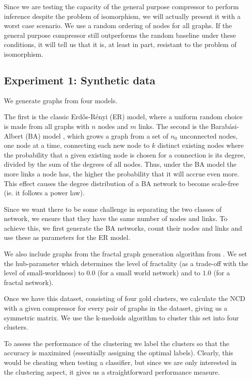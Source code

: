 \documentclass{article}
\begin{document}
Since we are testing the capacity of the general purpose compressor to perform inference despite the problem of isomorphism, we will actually present it with a worst case scenario. We use a random ordering of nodes for all graphs. If the general purpose compressor still outperforms the random baseline under these conditions, it will tell us that it is, at least in part, resistant to the problem of isomorphism.

\subsection*{Experiment 1: Synthetic data}

We generate graphs from four models. 

The first is the classic Erd\H{o}s-R\'enyi (ER) model, where a uniform random choice is made from all graphs with $n$ nodes and $m$ links. The second is the Barab\'asi-Albert (BA) model \cite{albert2002statistical}, which grows a graph from a set of $n_0$ unconnected nodes, one node at a time, connecting each new node to $k$ distinct existing nodes where the probability that a given existing node is chosen for a connection is its degree, divided by the sum of the degrees of all nodes. Thus, under the BA model the more links a node has, the higher the probability that it will accrue even more. This effect causes the degree distribution of a BA network to become scale-free (ie. it follows a power law).

Since we want there to be some challenge in separating the two classes of network, we ensure that they have the same number of nodes and links. To achieve this, we first generate the BA networks, count their nodes and links and use these as parameters for the ER model.
 
We also include graphs from the fractal graph generation algorithm from \cite{song2006origins}. We set the hub-parameter which determines the level of fractality (as a trade-off with the level of small-worldness) to $0.0$ (for a small world network) and to $1.0$ (for a fractal network).

Once we have this dataset, consisting of four gold clusters, we calculate the NCD with a given compressor for every pair of graphs in the dataset, giving us a symmetric matrix. We use the k-medoids algorithm to cluster this set into four clusters. 

To assess the performance of the clustering we label the clusters so that the accuracy is maximized (essentially assigning the optimal labels). Clearly, this would be cheating when testing a classifier, but since we are only interested in the clustering aspect, it gives us a straightforward performance measure.
\end{document}
